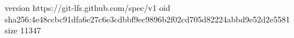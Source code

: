version https://git-lfs.github.com/spec/v1
oid sha256:4e48ccbc91dfa6e27c6e3cdbbf9ec9896b2f02cd705d82224abbd9e52d2e5581
size 11347
